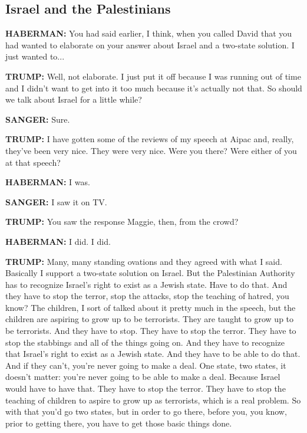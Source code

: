 \hypertarget{israel-and-the-palestinians}{%
\subsection{Israel and the
Palestinians}\label{israel-and-the-palestinians}}

\textbf{HABERMAN:} You had said earlier, I think, when you called David
that you had wanted to elaborate on your answer about Israel and a
two-state solution. I just wanted to...

\textbf{TRUMP:} Well, not elaborate. I just put it off because I was
running out of time and I didn't want to get into it too much because
it's actually not that. So should we talk about Israel for a little
while?

\textbf{SANGER:} Sure.

\textbf{TRUMP:} I have gotten some of the reviews of my speech at Aipac
and, really, they've been very nice. They were very nice. Were you
there? Were either of you at that speech?

\textbf{HABERMAN:} I was.

\textbf{SANGER:} I saw it on TV.

\textbf{TRUMP:} You saw the response Maggie, then, from the crowd?

\textbf{HABERMAN:} I did. I did.

\textbf{TRUMP:} Many, many standing ovations and they agreed with what I
said. Basically I support a two-state solution on Israel. But the
Palestinian Authority has to recognize Israel's right to exist as a
Jewish state. Have to do that. And they have to stop the terror, stop
the attacks, stop the teaching of hatred, you know? The children, I sort
of talked about it pretty much in the speech, but the children are
aspiring to grow up to be terrorists. They are taught to grow up to be
terrorists. And they have to stop. They have to stop the terror. They
have to stop the stabbings and all of the things going on. And they have
to recognize that Israel's right to exist as a Jewish state. And they
have to be able to do that. And if they can't, you're never going to
make a deal. One state, two states, it doesn't matter: you're never
going to be able to make a deal. Because Israel would have to have that.
They have to stop the terror. They have to stop the teaching of children
to aspire to grow up as terrorists, which is a real problem. So with
that you'd go two states, but in order to go there, before you, you
know, prior to getting there, you have to get those basic things done.

